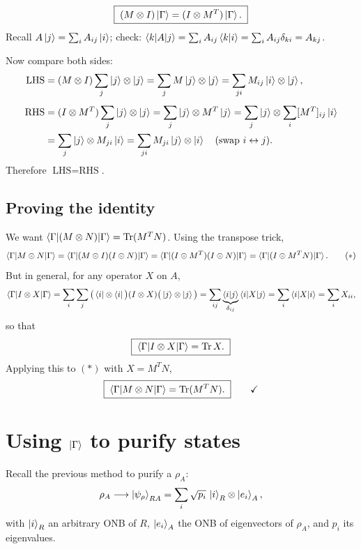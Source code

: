 \documentclass[11pt]{article}
\newcommand{\Tr}{\operatorname{Tr}}
\begin{document}
\[
\boxed{\;(M\otimes I)\ket{\Gamma} = (I\otimes M^{T})\ket{\Gamma}.\;}
\]
Recall $A\ket{j} = \sum_i A_{ij}\ket{i}$; check:
$\braket{k|A|j} = \sum_i A_{ij}\braket{k|i} = \sum_i A_{ij}\delta_{ki} = A_{kj}$. \checkmark

Now compare both sides:
\[
\begin{aligned}
\text{LHS} &= (M\otimes I)\sum_j \ket{j}\otimes\ket{j}
= \sum_j M\ket{j}\otimes\ket{j}
= \sum_{ji} M_{ij}\ket{i}\otimes\ket{j},\\[4pt]
\text{RHS} &= (I\otimes M^{T})\sum_j \ket{j}\otimes\ket{j}
= \sum_j \ket{j}\otimes M^{T}\ket{j}
= \sum_j \ket{j}\otimes\sum_i [M^{T}]_{ij}\ket{i}\\
&= \sum_j \ket{j}\otimes M_{ji}\ket{i}
= \sum_{ji} M_{ji}\ket{j}\otimes\ket{i}
\quad(\text{swap } i\leftrightarrow j).
\end{aligned}
\]
Therefore $\text{LHS}=\text{RHS}$.

\subsection{Proving the identity}

We want $\braket{\Gamma|(M\otimes N)|\Gamma} = \Tr(M^{T}N)$. Using the transpose
trick,
\[
\braket{\Gamma|M\otimes N|\Gamma}
= \braket{\Gamma|(M\otimes I)(I\otimes N)|\Gamma}
= \braket{\Gamma|(I\otimes M^{T})(I\otimes N)|\Gamma}
= \braket{\Gamma|(I\otimes M^{T}N)|\Gamma}. \tag{$*$}
\]
But in general, for any operator $X$ on $A$,
\[
\braket{\Gamma|I\otimes X|\Gamma}
= \sum_i\sum_j \big(\bra{i}\otimes\bra{i}\big)(I\otimes X)\big(\ket{j}\otimes\ket{j}\big)
= \sum_{ij}\underbrace{\braket{i|j}}_{\delta_{ij}}\braket{i|X|j}
= \sum_i \braket{i|X|i}
= \sum_i X_{ii},
\]
so that
\[
\boxed{\;\braket{\Gamma|I\otimes X|\Gamma} = \Tr X.\;}
\]
Applying this to $(*)$ with $X=M^{T}N$,
\[
\boxed{\;\braket{\Gamma|M\otimes N|\Gamma} = \Tr(M^{T}N).\;}
\qquad\checkmark
\]

\section{Using \texorpdfstring{$\ket{\Gamma}$}{Gamma} to purify states}

Recall the previous method to purify a $\rho_A$:
\[
\rho_A \longrightarrow \ket{\psi_\rho}_{RA} = \sum_i \sqrt{p_i}\,\ket{i}_R\otimes\ket{e_i}_A,
\]
with $\ket{i}_R$ an arbitrary ONB of $R$, $\ket{e_i}_A$ the ONB of eigenvectors
of $\rho_A$, and $p_i$ its eigenvalues.
\end{document}
